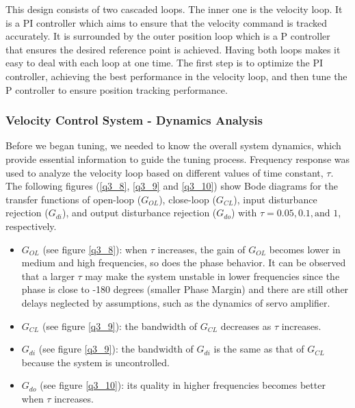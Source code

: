 \documentclass{article}
\theoremstyle{plain}
\theoremstyle{definition}
\theoremstyle{remark}
\begin{document}
This design consists of two cascaded loops. The inner one is the velocity loop. It is a PI controller which aims to ensure that the velocity command is tracked accurately. It is surrounded by the outer position loop which is a P controller that ensures the desired reference point is achieved. Having both loops makes it easy to deal with each loop at one time. The first step is to optimize the PI controller, achieving the best performance in the velocity loop, and then tune the P controller to ensure position tracking performance.\\

\subsubsection*{Velocity Control System - Dynamics Analysis}
Before we began tuning, we needed to know the overall system dynamics, which provide essential information to guide the tuning process. Frequency response was used to analyze the velocity loop based on different values of time constant, $\tau$. The following figures (\ref{q3_8}, \ref{q3_9} and \ref{q3_10}) show Bode diagrams for the transfer functions of open-loop ($G_{OL}$), close-loop ($G_{CL}$), input disturbance rejection ($G_{di}$), and output disturbance rejection ($G_{do}$) with $\tau = 0.05, 0.1, \text{and } 1$, respectively.

\begin{itemize}
\item $G_{OL}$ (see figure \ref{q3_8}): when $\tau$ increases, the gain of $G_{OL}$ becomes lower in medium and high frequencies, so does the phase behavior. It can be observed that a larger $\tau$ may make the system unstable in lower frequencies since the phase is close to -180 degrees (smaller Phase Margin) and there are still other delays neglected by assumptions, such as the dynamics of servo amplifier.   

\item $G_{CL}$ (see figure \ref{q3_9}): the bandwidth of $G_{CL}$ decreases as $\tau$ increases. 

\item $G_{di}$ (see figure \ref{q3_9}): the bandwidth of $G_{di}$ is the same as that of $G_{CL}$ because the system is uncontrolled.

\item $G_{do}$ (see figure \ref{q3_10}): its quality in higher frequencies becomes better when $\tau$ increases.

\end{itemize}
\end{document}
